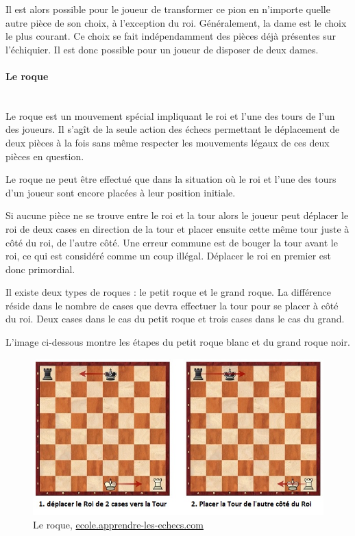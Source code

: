 \huge\documentclass{article}
\begin{document}
Il est alors possible pour le joueur de transformer ce pion en n'importe quelle autre pièce de son choix, à l'exception du roi. Généralement, la dame est le choix le plus courant. Ce choix se fait indépendamment des pièces déjà présentes sur l'échiquier. Il est donc possible pour un joueur de disposer de deux dames.

\paragraph{Le roque}
~~\\

Le roque est un mouvement spécial impliquant le roi et l'une des tours de l'un des joueurs. Il s'agît de la seule action des échecs permettant le déplacement de deux pièces à la fois sans même respecter les mouvements légaux de ces deux pièces en question.

Le roque ne peut être effectué que dans la situation où le roi et l'une des tours d'un joueur sont encore placées à leur position initiale.

Si aucune pièce ne se trouve entre le roi et la tour alors le joueur peut déplacer le roi de deux cases en direction de la tour et placer ensuite cette même tour juste à côté du roi, de l'autre côté. Une erreur commune est de bouger la tour avant le roi, ce qui est considéré comme un coup illégal. Déplacer le roi en premier est donc primordial.

Il existe deux types de roques : le petit roque et le grand roque. La différence réside dans le nombre de cases que devra effectuer la tour pour se placer à côté du roi. Deux cases dans le cas du petit roque et trois cases dans le cas du grand.

L'image ci-dessous montre les étapes du petit roque blanc et du grand roque noir.

\begin{figure}[h]
\centering
\includegraphics[scale=0.8]{img/roque.jpg}
\caption{Le roque,
\href{https://ecole.apprendre-les-echecs.com/roque/}{ecole.apprendre-les-echecs.com}}
\end{figure}
\end{document}
